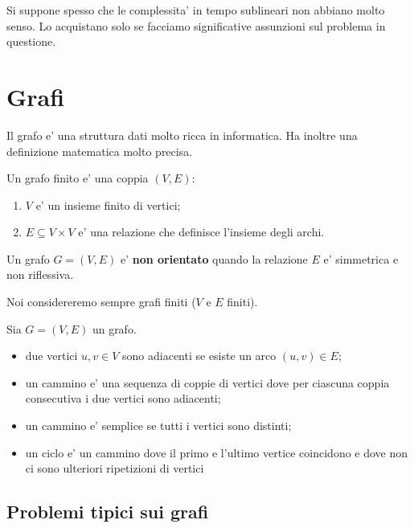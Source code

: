 Si suppone spesso che le complessita' in tempo sublineari non abbiano molto senso. Lo acquistano
solo se facciamo significative assunzioni sul problema in questione.

\section{Grafi}

Il grafo e' una struttura dati molto ricca in informatica. Ha inoltre una definizione matematica
molto precisa.

\begin{defn}
    Un grafo finito e' una coppia $(V,E)$:
    \begin{enumerate}
        \item $V$ e' un insieme finito di vertici;
        \item $E \subseteq V \times V$ e' una relazione che definisce l'insieme degli archi.
    \end{enumerate}
\end{defn}

Un grafo $G = (V,E)$ e' \textbf{non orientato} quando la relazione $E$ e' simmetrica e non
riflessiva.

Noi considereremo sempre grafi finiti ($V$ e $E$ finiti).

\begin{defn}
    Sia $G = (V,E)$ un grafo.
    \begin{itemize}
        \item due vertici $u,v \in V$ sono adiacenti se esiste un arco $(u,v) \in E$;
        \item un cammino e' una sequenza di coppie di vertici dove per ciascuna coppia consecutiva
        i due vertici sono adiacenti;
        \item un cammino e' semplice se tutti i vertici sono distinti;
        \item un ciclo e' un cammino dove il primo e l'ultimo vertice coincidono e dove non ci sono
        ulteriori ripetizioni di vertici
    \end{itemize}
\end{defn}

\subsection{Problemi tipici sui grafi}

